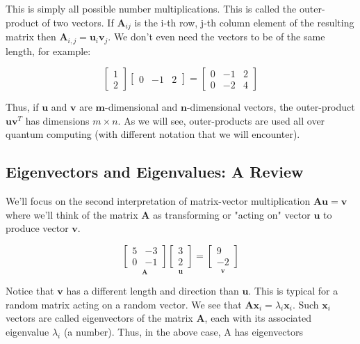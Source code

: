 \documentclass[main.tex]{subfiles}
\begin{document}
This is simply all possible number multiplications. This is called the outer-product of two vectors. If $\mathbf{A}_{i j}$ is the $\mathrm{i}$-th row, $\mathrm{j}$-th column element of the resulting matrix then $\mathbf{A}_{i, j}=\mathbf{u}_{i} \mathbf{v}_{j}$. We don't even need the vectors to be of the same length, for example:

$$
\left[\begin{array}{l}
1 \\
2
\end{array}\right]\left[\begin{array}{lll}
0 & -1 & 2
\end{array}\right]=\left[\begin{array}{lll}
0 & -1 & 2 \\
0 & -2 & 4
\end{array}\right]
$$

Thus, if $\mathbf{u}$ and $\mathbf{v}$ are $\mathbf{m}$-dimensional and $\mathbf{n}$-dimensional vectors, the outer-product $\mathbf{u v}^{T}$ has dimensions $m \times n$. As we will see, outer-products are used all over quantum computing (with different notation that we will encounter).

\subsection{Eigenvectors and Eigenvalues: A Review}

We'll focus on the second interpretation of matrix-vector multiplication $\mathbf{A u}=\mathbf{v}$ where we'll think of the matrix $\mathbf{A}$ as transforming or "acting on" vector $\mathbf{u}$ to produce vector $\mathbf{v}$.

$$
\underset{\mathbf{A}}{\left[\begin{array}{ll}
5 & -3 \\
0 & -1
\end{array}\right]}
\underset{\mathbf{u}}{\left[\begin{array}{l}
3 \\
2
\end{array}\right]}
=
\underset{\mathbf{v}}{\left[\begin{array}{r}
9 \\
-2
\end{array}\right]}
$$

Notice that $\mathbf{v}$ has a different length and direction than $\mathbf{u}$. This is typical for a random matrix acting on a random vector. We see that $\mathbf{A x}_{i}=\lambda_{i} \mathbf{x}_{i}$. Such $\mathbf{x}_{i}$ vectors are called eigenvectors of the matrix $\mathbf{A}$, each with its associated eigenvalue $\lambda_{i}$ (a number). Thus, in the above case, A has eigenvectors
\end{document}
